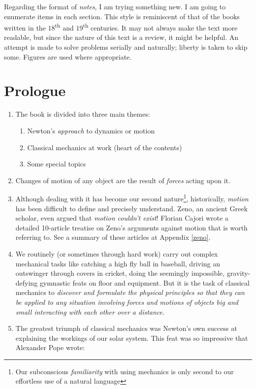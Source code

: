 \documentclass[12pt,a4paper]{book}
\newcounter{problem}[chapter] %
\begin{document}
Regarding the format of \emph{notes}, I am trying something new. I am going to enumerate items in each section. This style is reminiscent of that of the books written in the $18$\textsuperscript{th} and $19$\textsuperscript{th} centuries. It may not always make the text more readable, but since the nature of this text is a review, it might be helpful. An attempt is made to solve problems serially and naturally; liberty is taken to skip some. Figures are used where appropriate.

\chapter*{Prologue}

\begin{enumerate}
    \item The book is divided into three main themes:
        \begin{enumerate}
            \item Newton's \emph{approach} to dynamics or motion
            \item Classical mechanics at work (heart of the contents)
            \item Some special topics
        \end{enumerate}
    \item Changes of motion of any object are the result of \emph{forces} acting upon it. 
    \item Although dealing with it has become our second nature\footnote{Our subconscious \emph{familiarity} with using mechanics is only second to our effortless use of a natural language}, historically, \emph{motion} has been difficult to define and precisely understand. Zeno, an ancient Greek scholar, even argued that \emph{motion couldn't exist}! Florian Cajori wrote a detailed 10-article treatise on Zeno's arguments against motion \cite{cajori-zeno} that is worth referring to. See a summary of these articles at Appendix \ref{zeno}.
    \item We routinely (or sometimes through hard work) carry out complex mechanical tasks like catching a high fly ball in baseball, driving an outswinger through covers in cricket, doing the seemingly impossible, gravity-defying gymnastic feats on floor and equipment. But it is the task of classical mechanics to \emph{discover and formulate the physical principles so that they can be applied to any situation involving forces and motions of objects big and small interacting with each other over a distance}. 
    \item The greatest triumph of classical mechanics was Newton's own success at explaining the workings of our solar system. This feat was so impressive that Alexander Pope wrote:


\end{enumerate}
\end{document}
